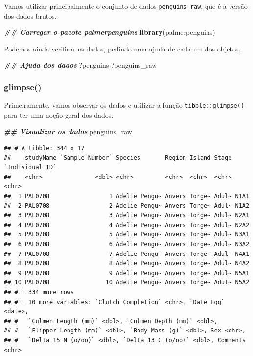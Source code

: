\documentclass[
]{article}
\newenvironment{Shaded}{\begin{snugshade}}{\end{snugshade}}
\newcommand{\DocumentationTok}[1]{\textcolor[rgb]{0.56,0.35,0.01}{\textbf{\textit{#1}}}}
\newcommand{\FunctionTok}[1]{\textcolor[rgb]{0.13,0.29,0.53}{\textbf{#1}}}
\newcommand{\NormalTok}[1]{#1}
\begin{document}
Vamos utilizar principalmente o conjunto de dados \texttt{penguins\_raw}, que é a versão dos dados brutos.

\begin{Shaded}
\begin{Highlighting}[]
\DocumentationTok{\#\# Carregar o pacote palmerpenguins}
\FunctionTok{library}\NormalTok{(palmerpenguins)}
\end{Highlighting}
\end{Shaded}

Podemos ainda verificar os dados, pedindo uma ajuda de cada um dos objetos.

\begin{Shaded}
\begin{Highlighting}[]
\DocumentationTok{\#\# Ajuda dos dados}
\NormalTok{?penguins}
\NormalTok{?penguins\_raw}
\end{Highlighting}
\end{Shaded}

\hypertarget{glimpse}{%
\subsubsection{glimpse()}\label{glimpse}}

Primeiramente, vamos observar os dados e utilizar a função \texttt{tibble::glimpse()} para ter uma noção geral dos dados.

\begin{Shaded}
\begin{Highlighting}[]
\DocumentationTok{\#\# Visualizar os dados}
\NormalTok{penguins\_raw}
\end{Highlighting}
\end{Shaded}

\begin{verbatim}
## # A tibble: 344 x 17
##    studyName `Sample Number` Species       Region Island Stage `Individual ID`
##    <chr>               <dbl> <chr>         <chr>  <chr>  <chr> <chr>          
##  1 PAL0708                 1 Adelie Pengu~ Anvers Torge~ Adul~ N1A1           
##  2 PAL0708                 2 Adelie Pengu~ Anvers Torge~ Adul~ N1A2           
##  3 PAL0708                 3 Adelie Pengu~ Anvers Torge~ Adul~ N2A1           
##  4 PAL0708                 4 Adelie Pengu~ Anvers Torge~ Adul~ N2A2           
##  5 PAL0708                 5 Adelie Pengu~ Anvers Torge~ Adul~ N3A1           
##  6 PAL0708                 6 Adelie Pengu~ Anvers Torge~ Adul~ N3A2           
##  7 PAL0708                 7 Adelie Pengu~ Anvers Torge~ Adul~ N4A1           
##  8 PAL0708                 8 Adelie Pengu~ Anvers Torge~ Adul~ N4A2           
##  9 PAL0708                 9 Adelie Pengu~ Anvers Torge~ Adul~ N5A1           
## 10 PAL0708                10 Adelie Pengu~ Anvers Torge~ Adul~ N5A2           
## # i 334 more rows
## # i 10 more variables: `Clutch Completion` <chr>, `Date Egg` <date>,
## #   `Culmen Length (mm)` <dbl>, `Culmen Depth (mm)` <dbl>,
## #   `Flipper Length (mm)` <dbl>, `Body Mass (g)` <dbl>, Sex <chr>,
## #   `Delta 15 N (o/oo)` <dbl>, `Delta 13 C (o/oo)` <dbl>, Comments <chr>
\end{verbatim}
\end{document}
